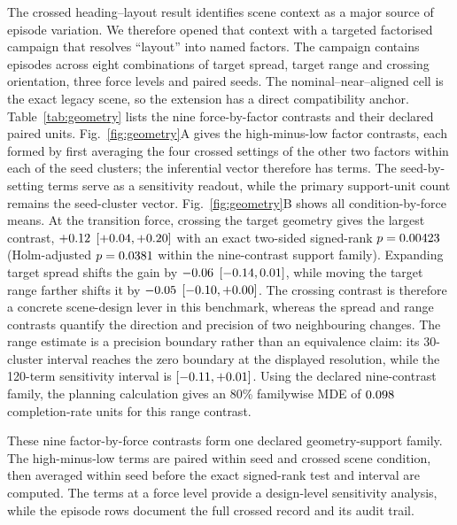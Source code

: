 The crossed heading--layout result identifies scene context as a major source of
episode variation. We therefore opened that context with a targeted factorised
campaign that resolves ``layout'' into named factors. The
campaign contains \NGeometryEpisodes{} episodes across eight combinations of
target spread, target range and crossing orientation, three force levels and
\NGeometrySeeds{} paired seeds. The nominal--near--aligned cell is the exact legacy
scene, so the extension has a direct compatibility anchor.
Table~\ref{tab:geometry} lists the nine force-by-factor contrasts and their
declared paired units. Fig.~\ref{fig:geometry}A gives
the high-minus-low factor contrasts, each formed by first averaging the four
crossed settings of the other two factors within each of the \NGeometryClusters{}
seed clusters; the inferential vector therefore has \NGeometryClusters{} terms.
The \NGeometryTermSensitivity{} seed-by-setting terms serve as a sensitivity
readout, while the primary support-unit count remains the seed-cluster vector.
Fig.~\ref{fig:geometry}B
shows all condition-by-force means. At the transition force, crossing the target
geometry gives the largest contrast, $+0.12{}$
$[+0.04{},+0.20{}]$ with an exact
two-sided signed-rank $p=0.00423{}$ (Holm-adjusted
$p=0.0381{}$ within the nine-contrast support family).
Expanding target spread shifts the gain by
$-0.06{}$ $[-0.14{},0.01{}]$,
while moving the target range farther shifts it by
$-0.05{}$ $[-0.10{},+0.00{}]$.
The crossing contrast is therefore a concrete scene-design lever in this
benchmark, whereas the spread and range contrasts quantify the direction and
precision of two neighbouring changes. The range estimate is a precision
boundary rather than an equivalence claim: its 30-cluster interval reaches the
zero boundary at the displayed resolution, while the 120-term sensitivity
interval is $[-0.11{},+0.01{}]$.
Using the declared nine-contrast family, the planning calculation gives an 80\%
familywise MDE of $0.098{}$ completion-rate units for this range
contrast.

These nine factor-by-force contrasts form one declared geometry-support family.
The high-minus-low terms are paired within seed and crossed scene condition, then
averaged within seed before the exact signed-rank test and interval are computed.
The \NGeometryTermSensitivity{} terms at a force level provide a design-level
sensitivity analysis, while the \NGeometryEpisodes{} episode rows document the
full crossed record and its audit trail.

